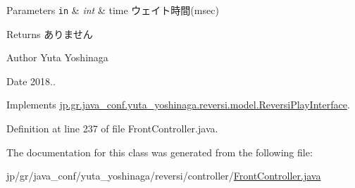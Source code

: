 \begin{DoxyParams}[1]{Parameters}
\mbox{\tt in}  & {\em int} & time ウェイト時間(msec) \\
\hline
\end{DoxyParams}
\begin{DoxyReturn}{Returns}
ありません 
\end{DoxyReturn}
\begin{DoxyAuthor}{Author}
Yuta Yoshinaga 
\end{DoxyAuthor}
\begin{DoxyDate}{Date}
2018.. 
\end{DoxyDate}


Implements \hyperlink{interfacejp_1_1gr_1_1java__conf_1_1yuta__yoshinaga_1_1reversi_1_1model_1_1_reversi_play_interface}{jp.\+gr.\+java\+\_\+conf.\+yuta\+\_\+yoshinaga.\+reversi.\+model.\+Reversi\+Play\+Interface}.



Definition at line 237 of file Front\+Controller.\+java.



The documentation for this class was generated from the following file\+:\begin{DoxyCompactItemize}
\item 
jp/gr/java\+\_\+conf/yuta\+\_\+yoshinaga/reversi/controller/\hyperlink{_front_controller_8java}{Front\+Controller.\+java}\end{DoxyCompactItemize}
